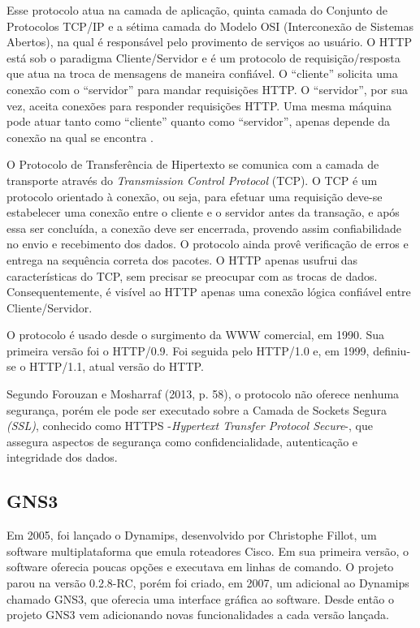 Esse protocolo atua na camada de aplicação, quinta camada do Conjunto de Protocolos TCP/IP e a sétima camada do Modelo OSI (Interconexão de Sistemas Abertos), na qual é responsável pelo provimento de serviços ao usuário.
O HTTP está sob o paradigma Cliente/Servidor e é um protocolo de requisição/resposta que atua na troca de mensagens de maneira confiável. O “cliente” solicita uma conexão com o “servidor” para mandar requisições HTTP. O “servidor”, por sua vez, aceita conexões para responder requisições HTTP. Uma mesma máquina pode atuar tanto como “cliente” quanto como “servidor”, apenas depende da conexão na qual se encontra \cite{rfc7230}.

O Protocolo de Transferência de Hipertexto se comunica com a camada de transporte através do \textit{Transmission Control Protocol} (TCP). O TCP é um protocolo orientado à conexão, ou seja, para efetuar uma requisição deve-se estabelecer uma conexão entre o cliente e o servidor antes da transação, e após essa ser concluída, a conexão deve ser encerrada, provendo assim confiabilidade no envio e recebimento dos dados. O protocolo ainda provê verificação de erros e entrega na sequência correta dos pacotes. O HTTP apenas usufrui das características do TCP, sem precisar se preocupar com as trocas de dados. Consequentemente, é visível ao HTTP apenas uma conexão lógica confiável entre Cliente/Servidor.

O protocolo é usado desde o surgimento da WWW comercial, em 1990. Sua primeira versão foi o HTTP/0.9. Foi seguida pelo HTTP/1.0 e, em 1999, definiu-se o HTTP/1.1, atual versão do HTTP.

Segundo Forouzan e Mosharraf (2013, p. 58), o protocolo não oferece nenhuma segurança, porém ele pode ser executado sobre a Camada de Sockets Segura \textit{(SSL)}, conhecido como HTTPS -\textit{Hypertext Transfer Protocol Secure}-, que assegura aspectos de segurança como confidencialidade, autenticação e integridade dos dados.

\subsection{GNS3}

Em 2005, foi lançado o Dynamips, desenvolvido por Christophe Fillot, um software multiplataforma que emula roteadores Cisco. Em sua primeira versão, o software oferecia poucas opções e executava em linhas de comando. O projeto parou na versão 0.2.8-RC, porém foi criado, em 2007, um adicional ao Dynamips chamado GNS3, que oferecia uma interface gráfica ao software.  Desde então o projeto GNS3 vem adicionando novas funcionalidades a cada versão lançada.

